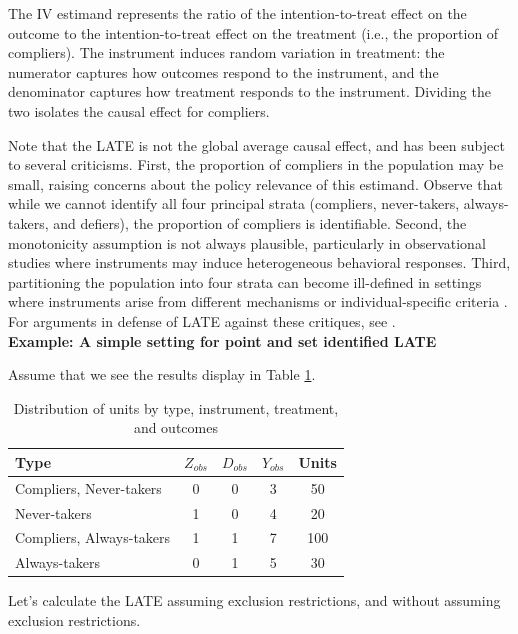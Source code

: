The IV estimand represents the ratio of the intention-to-treat effect on the outcome to the intention-to-treat effect on the treatment (i.e., the proportion of compliers). The instrument induces random variation in treatment: the numerator captures how outcomes respond to the instrument, and the denominator captures how treatment responds to the instrument. Dividing the two isolates the causal effect for compliers.

Note that the LATE is not the global average causal effect, and has been subject to several criticisms. First, the proportion of compliers in the population may be small, raising concerns about the policy relevance of this estimand. Observe that while we cannot identify all four principal strata (compliers, never-takers, always-takers, and defiers), the proportion of compliers is identifiable. Second, the monotonicity assumption is not always plausible, particularly in observational studies where instruments may induce heterogeneous behavioral responses. Third, partitioning the population into four strata can become ill-defined in settings where instruments arise from different mechanisms or individual-specific criteria \cite{deaton2010instruments,hernan2020causal}. For arguments in defense of LATE against these critiques, see \cite{angrist2010better}.\\

\textbf{Example: A simple setting for point and set identified LATE}

Assume that we see the results display in Table \ref{tab:types}.

\begin{table}[ht]
	\centering
	\caption{Distribution of units by type, instrument, treatment, and outcomes}
	\label{tab:types}
	\begin{tabular}{lcccc}
		\hline
		Type & $Z_{obs}$ & $D_{obs}$ & $Y_{obs}$ & Units \\
		\hline
		Compliers, Never-takers & 0 & 0 & 3 & 50 \\
		Never-takers   & 1 & 0 & 4 & 20  \\
		Compliers, Always-takers & 1 & 1 & 7 & 100  \\
		 Always-takers   & 0 & 1 & 5 & 30  \\
		\hline
	\end{tabular}
\end{table}

Let's calculate the LATE assuming exclusion restrictions, and without assuming exclusion restrictions.

